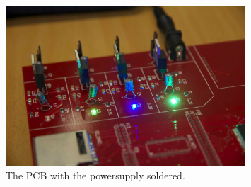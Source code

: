 \begin{figure}[H]
  \centering
  \includegraphics[width=0.8\textwidth]{fig/pcb/pcb_powersoldered.jpeg}
  \caption[The PCB Power Supply]{The PCB with the powersupply soldered.}
  \label{fig:pcb-powersoldered}
\end{figure}
